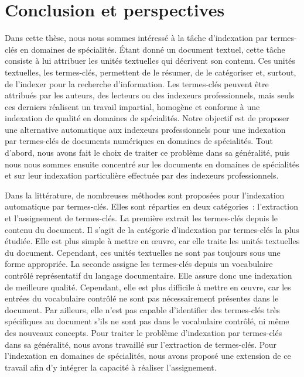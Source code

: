 \chapter{Conclusion et perspectives}
\label{chap:main-conclusion}

  Dans cette thèse, nous nous sommes intéressé à la tâche d'indexation par
  termes-clés en domaines de spécialités. Étant donné un document textuel, cette
  tâche consiste à lui attribuer les unités textuelles qui décrivent son
  contenu. Ces unités textuelles, les termes-clés, permettent de le résumer, de
  le catégoriser et, surtout, de l'indexer pour la recherche d'information. Les
  termes-clés peuvent être attribués par les auteurs, des lecteurs ou des
  indexeurs professionnels, mais seuls ces derniers réalisent un travail
  impartial, homogène et conforme à une indexation de qualité en domaines de
  spécialités. Notre objectif est de proposer une alternative automatique aux
  indexeurs professionnels pour une indexation par termes-clés de documents
  numériques en domaines de spécialités. Tout d'abord, nous avons fait le choix
  de traiter ce problème dans sa généralité, puis nous nous sommes ensuite
  concentré sur les documents en domaines de spécialités et sur leur indexation
  particulière effectuée par des indexeurs professionnels.

  Dans la littérature, de nombreuses méthodes sont proposées pour l'indexation
  automatique par termes-clés. Elles sont réparties en deux catégories~:
  l'extraction et l'assignement de termes-clés. La première extrait les
  termes-clés depuis le contenu du document. Il s'agit de la catégorie
  d'indexation par termes-clés la plus étudiée. Elle est plus simple à mettre en
  \oe{}uvre, car elle traite les unités textuelles du document. Cependant, ces
  unités textuelles ne sont pas toujours sous une forme appropriée. La seconde
  assigne les termes-clés depuis un vocabulaire contrôlé représentatif du
  langage documentaire. Elle assure donc une indexation de meilleure qualité.
  Cependant, elle est plus difficile à mettre en \oe{}uvre, car les entrées du
  vocabulaire contrôlé ne sont pas nécessairement présentes dans le document.
  Par ailleurs, elle n'est pas capable d'identifier des termes-clés très
  spécifiques au document s'ils ne sont pas dans le vocabulaire contrôlé, ni
  même des nouveaux concepts. Pour traiter le problème d'indexation par
  termes-clés dans sa généralité, nous avons travaillé sur l'extraction de
  termes-clés. Pour l'indexation en domaines de spécialités, nous avons proposé
  une extension de ce travail afin d'y intégrer la capacité à réaliser
  l'assignement.


